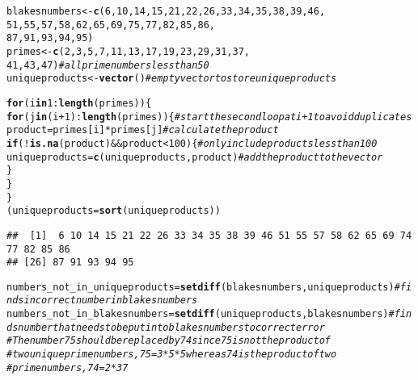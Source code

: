 \documentclass{article}\usepackage[]{graphicx}\usepackage[]{xcolor}
\makeatletter
\newcommand{\hlnum}[1]{\textcolor[rgb]{0.686,0.059,0.569}{#1}}%
\newcommand{\hlcom}[1]{\textcolor[rgb]{0.678,0.584,0.686}{\textit{#1}}}%
\newcommand{\hlopt}[1]{\textcolor[rgb]{0,0,0}{#1}}%
\newcommand{\hldef}[1]{\textcolor[rgb]{0.345,0.345,0.345}{#1}}%
\newcommand{\hlkwa}[1]{\textcolor[rgb]{0.161,0.373,0.58}{\textbf{#1}}}%
\newcommand{\hlkwb}[1]{\textcolor[rgb]{0.69,0.353,0.396}{#1}}%
\newcommand{\hlkwd}[1]{\textcolor[rgb]{0.737,0.353,0.396}{\textbf{#1}}}%
\newenvironment{kframe}{%
 \def\at@end@of@kframe{}%
 \ifinner\ifhmode%
  \def\at@end@of@kframe{\end{minipage}}%
  \begin{minipage}{\columnwidth}%
 \fi\fi%
 \def\FrameCommand##1{\hskip\@totalleftmargin \hskip-\fboxsep
 \colorbox{shadecolor}{##1}\hskip-\fboxsep
     \hskip-\linewidth \hskip-\@totalleftmargin \hskip\columnwidth}%
 \MakeFramed {\advance\hsize-\width
   \@totalleftmargin\z@ \linewidth\hsize
   \@setminipage}}%
 {\par\unskip\endMakeFramed%
 \at@end@of@kframe}
\newenvironment{knitrout}{}{} %
\makeatother
\begin{document}
\begin{enumerate}
\begin{knitrout}\scriptsize
{}\color{fgcolor}\begin{kframe}
\begin{alltt}
\hldef{blakesnumbers} \hlkwb{<-} \hlkwd{c}\hldef{(}\hlnum{6}\hldef{,} \hlnum{10}\hldef{,} \hlnum{14}\hldef{,} \hlnum{15}\hldef{,} \hlnum{21}\hldef{,} \hlnum{22}\hldef{,} \hlnum{26}\hldef{,} \hlnum{33}\hldef{,} \hlnum{34}\hldef{,} \hlnum{35}\hldef{,} \hlnum{38}\hldef{,} \hlnum{39}\hldef{,} \hlnum{46}\hldef{,}
                   \hlnum{51}\hldef{,} \hlnum{55}\hldef{,} \hlnum{57}\hldef{,} \hlnum{58}\hldef{,} \hlnum{62}\hldef{,} \hlnum{65}\hldef{,} \hlnum{69}\hldef{,} \hlnum{75}\hldef{,} \hlnum{77}\hldef{,} \hlnum{82}\hldef{,} \hlnum{85}\hldef{,} \hlnum{86}\hldef{,}
                   \hlnum{87}\hldef{,} \hlnum{91}\hldef{,} \hlnum{93}\hldef{,} \hlnum{94}\hldef{,} \hlnum{95}\hldef{)}
\hldef{primes} \hlkwb{<-} \hlkwd{c}\hldef{(}\hlnum{2}\hldef{,} \hlnum{3}\hldef{,} \hlnum{5}\hldef{,} \hlnum{7}\hldef{,} \hlnum{11}\hldef{,} \hlnum{13}\hldef{,} \hlnum{17}\hldef{,} \hlnum{19}\hldef{,} \hlnum{23}\hldef{,} \hlnum{29}\hldef{,} \hlnum{31}\hldef{,} \hlnum{37}\hldef{,}
            \hlnum{41}\hldef{,} \hlnum{43}\hldef{,} \hlnum{47}\hldef{)}  \hlcom{# all prime numbers less than 50}
\hldef{uniqueproducts} \hlkwb{<-} \hlkwd{vector}\hldef{()}  \hlcom{# empty vector to store unique products}

\hlkwa{for} \hldef{(i} \hlkwa{in} \hlnum{1}\hlopt{:}\hlkwd{length}\hldef{(primes)) \{}
  \hlkwa{for} \hldef{(j} \hlkwa{in} \hldef{(i}\hlopt{+}\hlnum{1}\hldef{)}\hlopt{:}\hlkwd{length}\hldef{(primes)) \{}  \hlcom{# start the second loop at i+1 to avoid duplicates}
    \hldef{product} \hlkwb{=} \hldef{primes[i]} \hlopt{*} \hldef{primes[j]}  \hlcom{# calculate the product}
    \hlkwa{if} \hldef{(}\hlopt{!}\hlkwd{is.na}\hldef{(product)} \hlopt{&&} \hldef{product} \hlopt{<} \hlnum{100}\hldef{) \{}  \hlcom{# only include products less than 100}
      \hldef{uniqueproducts} \hlkwb{=} \hlkwd{c}\hldef{(uniqueproducts, product)}  \hlcom{# add the product to the vector}
    \hldef{\}}
  \hldef{\}}
\hldef{\}}
\hldef{(uniqueproducts}\hlkwb{=}\hlkwd{sort}\hldef{(uniqueproducts))}
\end{alltt}
\begin{verbatim}
##  [1]  6 10 14 15 21 22 26 33 34 35 38 39 46 51 55 57 58 62 65 69 74 77 82 85 86
## [26] 87 91 93 94 95
\end{verbatim}
\begin{alltt}
\hldef{numbers_not_in_uniqueproducts} \hlkwb{=} \hlkwd{setdiff}\hldef{(blakesnumbers, uniqueproducts)} \hlcom{#finds incorrect number in blakes numbers}
\hldef{numbers_not_in_blakesnumbers} \hlkwb{=}\hlkwd{setdiff}\hldef{(uniqueproducts, blakesnumbers)} \hlcom{#finds number that needs to be put into blakes numbers to correct error}
\hlcom{#The number 75 should be replaced by 74 since 75 is not the product of }
\hlcom{#two unique prime numbers, 75=3*5*5 whereas 74 is the product of two }
\hlcom{#prime numbers, 74=2*37}
\end{alltt}
\end{kframe}
\end{knitrout}
\end{enumerate}


\end{document}
